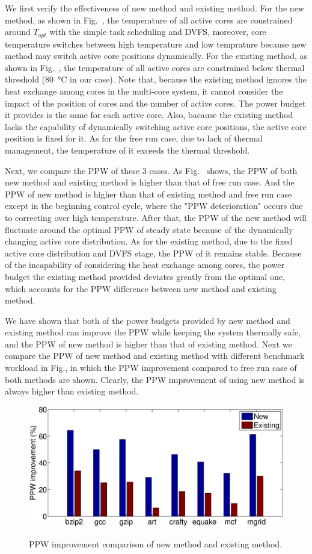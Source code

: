 We first verify the effectiveness of new method and existing method. For the new method, as shown in Fig.~\cite{fig:tem_own}, the temperature of all active cores are constrained around $T_{opt}$ with the simple task scheduling and DVFS, moreover, core temperature switches between high temperature and low temprature because new method may switch active core positions dynamically. For the existing method, as shown in Fig.~\cite{fig:tem_mag}, the temperature of all active cores are constrained below thermal threshold (\SI{80}{\degreeCelsius} in our case). Note that, because the existing method ignores the heat exchange among cores in the multi-core system, it cannot consider the impact of the position of cores and 
the number of active cores. The power budget it provides is the same for each active core. Also, bacause the existing method lacks the capability of dynamically switching active core positions, the active core position is fixed for it. As for the free run case, due to lack of thermal management, the temperature of it exceeds the thermal threshold.

Next, we compare the PPW of these $3$ cases. As Fig.~\cite{fig:PPW} shows, the PPW of both new method and existing method is higher than that of free run case. And the PPW of new method is higher than that of existing method and free run case except in the beginning control cycle, where the "PPW deterioration" occurs due to correcting over high temperature. After that, the PPW of the new method will fluctuate around the optimal PPW of steady state because of the dynamically changing active core distribution. As for the existing method, due to the fixed active core distribution and DVFS stage, the PPW of it remains stable. Because of the incapability of considering the heat exchange among cores, the power budget the existing method provided deviates greatly from the optimal one, which accounts for the PPW difference between new method and existing method. 

We have shown that both of the power budgets provided by new method and existing method can improve the PPW while keeping the system thermally safe, and the PPW of new method is higher than that of existing method. Next we compare the PPW of new method and existing method with different benchmark workload in Fig.\cite{fig:transient_ppw_spec}, in which the PPW improvement compared to free run case of both methods are shown. Clearly, the PPW improvement of using new method is always higher than existing method.

\begin{figure}
\centering
\includegraphics[width=1\linewidth]{fig/transient_ppw.eps}\label{fig:transient_ppw_spec}
\caption{PPW improvement comparison of new method and existing method.}
\end{figure}





